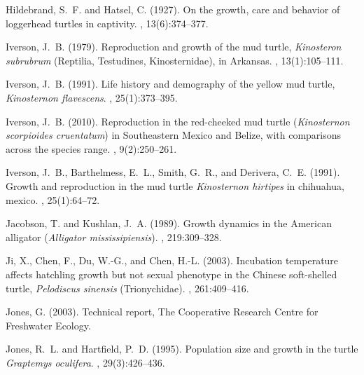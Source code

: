 \documentclass{article}
\begin{document}
\begin{thebibliography}{}
Hildebrand, S.~F. and Hatsel, C. (1927).
\newblock On the growth, care and behavior of loggerhead turtles in captivity.
, 13(6):374--377.

Iverson, J.~B. (1979).
\newblock Reproduction and growth of the mud turtle, \emph{Kinosteron
  subrubrum} ({R}eptilia, {T}estudines, {K}inosternidae), in {A}rkansas.
, 13(1):105--111.

Iverson, J.~B. (1991).
\newblock Life history and demography of the yellow mud turtle,
  \emph{Kinosternon flavescens}.
, 25(1):373--395.

Iverson, J.~B. (2010).
\newblock Reproduction in the red-cheeked mud turtle (\emph{Kinosternon
  scorpioides cruentatum}) in {S}outheastern {M}exico and {B}elize, with
  comparisons across the species range.
, 9(2):250--261.

Iverson, J.~B., Barthelmess, E.~L., Smith, G.~R., and Derivera, C.~E. (1991).
\newblock Growth and reproduction in the mud turtle \emph{Kinosternon hirtipes}
  in chihuahua, mexico.
, 25(1):64--72.

Jacobson, T. and Kushlan, J.~A. (1989).
\newblock Growth dynamics in the {A}merican alligator (\emph{Alligator
  mississipiensis}).
, 219:309--328.

Ji, X., Chen, F., Du, W.-G., and Chen, H.-L. (2003).
\newblock Incubation temperature affects hatchling growth but not sexual
  phenotype in the {C}hinese soft-shelled turtle, \emph{Pelodiscus sinensis}
  ({T}rionychidae).
, 261:409--416.

Jones, G. (2003).
\newblock Technical report, The Cooperative Research Centre for Freshwater
  Ecology.

Jones, R.~L. and Hartfield, P.~D. (1995).
\newblock Population size and growth in the turtle \emph{Graptemys oculifera}.
, 29(3):426--436.


\end{thebibliography}
\end{document}
